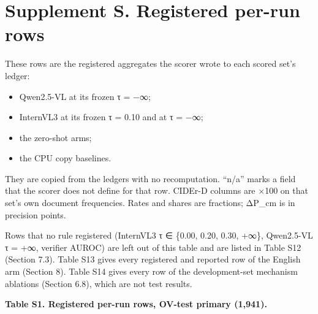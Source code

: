 \section{Supplement S. Registered per-run rows}\label{supplement-s.-registered-per-run-rows}

These rows are the registered aggregates the scorer wrote to each scored set's ledger:

\begin{itemize}
\tightlist
\item
  Qwen2.5-VL at its frozen τ = −∞;
\item
  InternVL3 at its frozen τ = 0.10 and at τ = −∞;
\item
  the zero-shot arms;
\item
  the CPU copy baselines.
\end{itemize}

They are copied from the ledgers with no recomputation. ``n/a'' marks a field that the scorer does
not define for that row. CIDEr-D columns are ×100 on that set's own document frequencies. Rates and
shares are fractions; ΔP\_cm is in precision points.

Rows that no rule registered (InternVL3 τ ∈ \{0.00, 0.20, 0.30, +∞\}, Qwen2.5-VL τ = +∞, verifier
AUROC) are left out of this table and are listed in Table S12 (Section 7.3). Table S13 gives every
registered and reported row of the English arm (Section 8). Table S14 gives every row of the
development-set mechanism ablations (Section 6.8), which are not test results.

\textbf{Table S1. Registered per-run rows, OV-test primary (1,941).}


